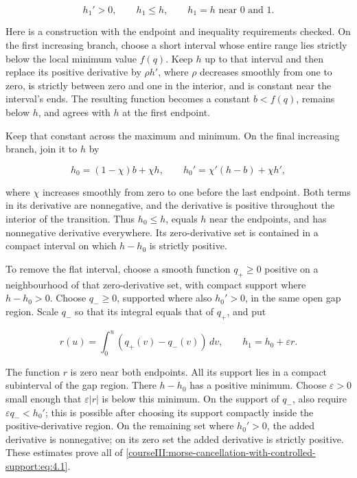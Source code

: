 \begin{equation}
h_1'>0,\qquad h_1\leq h,\qquad
h_1=h\text{ near }0\text{ and }1.
\label{courseIII:morse-cancellation-with-controlled-support:eq:4.1}
\end{equation}

Here is a construction with the endpoint and inequality requirements checked. On the first increasing branch, choose a short interval whose entire range lies strictly below the local minimum value \(f(q)\). Keep \(h\) up to that interval and then replace its positive derivative by \(\rho h'\), where \(\rho\) decreases smoothly from one to zero, is strictly between zero and one in the interior, and is constant near the interval's ends. The resulting function becomes a constant \(b<f(q)\), remains below \(h\), and agrees with \(h\) at the first endpoint.

Keep that constant across the maximum and minimum. On the final increasing branch, join it to \(h\) by

\begin{equation}
h_0=(1-\chi)b+\chi h,
\qquad
h_0'=\chi'(h-b)+\chi h',
\label{courseIII:morse-cancellation-with-controlled-support:eq:4.2}
\end{equation}

where \(\chi\) increases smoothly from zero to one before the last endpoint. Both terms in its derivative are nonnegative, and the derivative is positive throughout the interior of the transition. Thus \(h_0\leq h\), equals \(h\) near the endpoints, and has nonnegative derivative everywhere. Its zero-derivative set is contained in a compact interval on which \(h-h_0\) is strictly positive.

To remove the flat interval, choose a smooth function \(q_+\geq0\) positive on a neighbourhood of that zero-derivative set, with compact support where \(h-h_0>0\). Choose \(q_-\geq0\), supported where also \(h_0'>0\), in the same open gap region. Scale \(q_-\) so that its integral equals that of \(q_+\), and put

\begin{equation}
r(u)=\int_0^u(q_+(v)-q_-(v))\,dv,
\qquad h_1=h_0+\varepsilon r.
\label{courseIII:morse-cancellation-with-controlled-support:eq:4.3}
\end{equation}

The function \(r\) is zero near both endpoints. All its support lies in a compact subinterval of the gap region. There \(h-h_0\) has a positive minimum. Choose \(\varepsilon>0\) small enough that \(\varepsilon|r|\) is below this minimum. On the support of \(q_-\), also require \(\varepsilon q_-<h_0'\); this is possible after choosing its support compactly inside the positive-derivative region. On the remaining set where \(h_0'>0\), the added derivative is nonnegative; on its zero set the added derivative is strictly positive. These estimates prove all of \eqref{courseIII:morse-cancellation-with-controlled-support:eq:4.1}.

